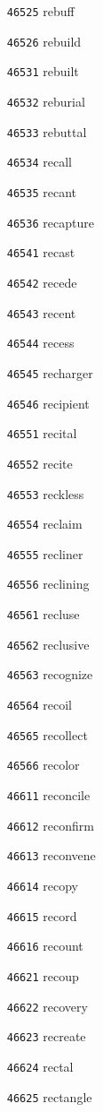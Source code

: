\documentclass[twoside,11pt]{article}
\begin{document}
\begin{multicols}{5}
\begin{enumerate}
\item[\texttt{46525}] rebuff
\item[\texttt{46526}] rebuild
\item[\texttt{46531}] rebuilt
\item[\texttt{46532}] reburial
\item[\texttt{46533}] rebuttal
\item[\texttt{46534}] recall
\item[\texttt{46535}] recant
\item[\texttt{46536}] recapture
\item[\texttt{46541}] recast
\item[\texttt{46542}] recede
\item[\texttt{46543}] recent
\item[\texttt{46544}] recess
\item[\texttt{46545}] recharger
\item[\texttt{46546}] recipient
\item[\texttt{46551}] recital
\item[\texttt{46552}] recite
\item[\texttt{46553}] reckless
\item[\texttt{46554}] reclaim
\item[\texttt{46555}] recliner
\item[\texttt{46556}] reclining
\item[\texttt{46561}] recluse
\item[\texttt{46562}] reclusive
\item[\texttt{46563}] recognize
\item[\texttt{46564}] recoil
\item[\texttt{46565}] recollect
\item[\texttt{46566}] recolor
\item[\texttt{46611}] reconcile
\item[\texttt{46612}] reconfirm
\item[\texttt{46613}] reconvene
\item[\texttt{46614}] recopy
\item[\texttt{46615}] record
\item[\texttt{46616}] recount
\item[\texttt{46621}] recoup
\item[\texttt{46622}] recovery
\item[\texttt{46623}] recreate
\item[\texttt{46624}] rectal
\item[\texttt{46625}] rectangle

\end{enumerate}
\end{multicols}
\end{document}
